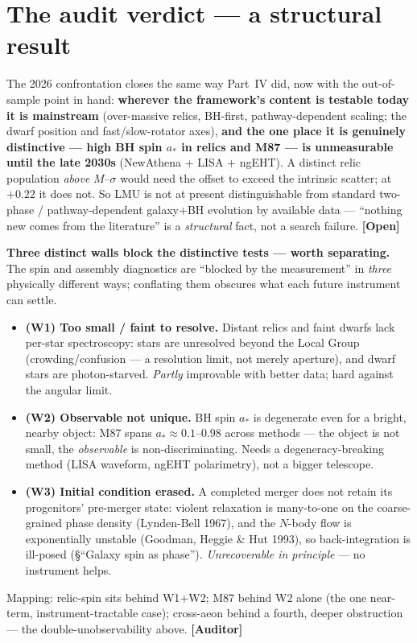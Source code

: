 \documentclass[11pt]{article}
\newcommand{\Open}{\textbf{\textcolor{gray!10!black}{[Open]}}}
\newcommand{\Auditor}{\textbf{\textcolor{teal!55!black}{[Auditor]}}}
\begin{document}
\section{The audit verdict --- a structural result}
The 2026 confrontation closes the same way Part~IV did, now with the out-of-sample point in hand: \textbf{wherever the framework's content is testable today it is mainstream} (over-massive relics, BH-first, pathway-dependent scaling; the dwarf position and fast/slow-rotator axes), \textbf{and the one place it is genuinely distinctive --- high BH spin $a_\ast$ in relics and M87 --- is unmeasurable until the late 2030s} (NewAthena $+$ LISA $+$ ngEHT). A distinct relic population \emph{above} $M$--$\sigma$ would need the offset to exceed the intrinsic scatter; at $+0.22$ it does not. So LMU is not at present distinguishable from standard two-phase / pathway-dependent galaxy$+$BH evolution by available data --- ``nothing new comes from the literature'' is a \emph{structural} fact, not a search failure. \Open

\medskip\noindent\textbf{Three distinct walls block the distinctive tests --- worth separating.} The spin and assembly diagnostics are ``blocked by the measurement'' in \emph{three} physically different ways; conflating them obscures what each future instrument can settle.
\begin{itemize}[leftmargin=1.3em,itemsep=2pt]
\item \textbf{(W1) Too small / faint to resolve.} Distant relics and faint dwarfs lack per-star spectroscopy: stars are unresolved beyond the Local Group (crowding/confusion --- a resolution limit, not merely aperture), and dwarf stars are photon-starved. \emph{Partly} improvable with better data; hard against the angular limit.
\item \textbf{(W2) Observable not unique.} BH spin $a_\ast$ is degenerate even for a bright, nearby object: M87 spans $a_\ast\!\approx\!0.1$--$0.98$ across methods --- the object is not small, the \emph{observable} is non-discriminating. Needs a degeneracy-breaking method (LISA waveform, ngEHT polarimetry), not a bigger telescope.
\item \textbf{(W3) Initial condition erased.} A completed merger does not retain its progenitors' pre-merger state: violent relaxation is many-to-one on the coarse-grained phase density (Lynden-Bell 1967), and the $N$-body flow is exponentially unstable (Goodman, Heggie \& Hut 1993), so back-integration is ill-posed (\S``Galaxy spin as phase''). \emph{Unrecoverable in principle} --- no instrument helps.
\end{itemize}
Mapping: relic-spin sits behind W1$+$W2; M87 behind W2 alone (the one near-term, instrument-tractable case); cross-aeon behind a fourth, deeper obstruction --- the double-unobservability above. \Auditor
\end{document}
